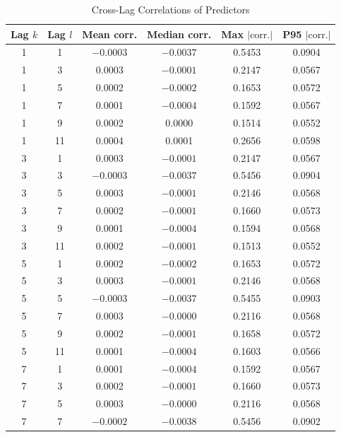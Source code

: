 \documentclass[11pt]{article}
\begin{document}
\endgroup



\begin{table}[H]
\centering
\caption{Cross-Lag Correlations of Predictors}
\label{tab:cross_lag_correlations}
\scriptsize
\setlength{\tabcolsep}{6pt}
\renewcommand{\arraystretch}{1.15}

\begin{tabular}{cccccc}
\toprule
Lag $k$ & Lag $l$ & Mean corr. & Median corr. & Max $|\text{corr.}|$ & P95 $|\text{corr.}|$ \\
\midrule
1  & 1  & $-0.0003$ & $-0.0037$ & 0.5453 & 0.0904 \\
1  & 3  &  0.0003  & $-0.0001$ & 0.2147 & 0.0567 \\
1  & 5  &  0.0002  & $-0.0002$ & 0.1653 & 0.0572 \\
1  & 7  &  0.0001  & $-0.0004$ & 0.1592 & 0.0567 \\
1  & 9  &  0.0002  &  0.0000  & 0.1514 & 0.0552 \\
1  & 11 &  0.0004  &  0.0001  & 0.2656 & 0.0598 \\
\midrule
3  & 1  &  0.0003  & $-0.0001$ & 0.2147 & 0.0567 \\
3  & 3  & $-0.0003$ & $-0.0037$ & 0.5456 & 0.0904 \\
3  & 5  &  0.0003  & $-0.0001$ & 0.2146 & 0.0568 \\
3  & 7  &  0.0002  & $-0.0001$ & 0.1660 & 0.0573 \\
3  & 9  &  0.0001  & $-0.0004$ & 0.1594 & 0.0568 \\
3  & 11 &  0.0002  & $-0.0001$ & 0.1513 & 0.0552 \\
\midrule
5  & 1  &  0.0002  & $-0.0002$ & 0.1653 & 0.0572 \\
5  & 3  &  0.0003  & $-0.0001$ & 0.2146 & 0.0568 \\
5  & 5  & $-0.0003$ & $-0.0037$ & 0.5455 & 0.0903 \\
5  & 7  &  0.0003  & $-0.0000$ & 0.2116 & 0.0568 \\
5  & 9  &  0.0002  & $-0.0001$ & 0.1658 & 0.0572 \\
5  & 11 &  0.0001  & $-0.0004$ & 0.1603 & 0.0566 \\
\midrule
7  & 1  &  0.0001  & $-0.0004$ & 0.1592 & 0.0567 \\
7  & 3  &  0.0002  & $-0.0001$ & 0.1660 & 0.0573 \\
7  & 5  &  0.0003  & $-0.0000$ & 0.2116 & 0.0568 \\
7  & 7  & $-0.0002$ & $-0.0038$ & 0.5456 & 0.0902 \\

\end{tabular}
\end{table}
\end{document}
